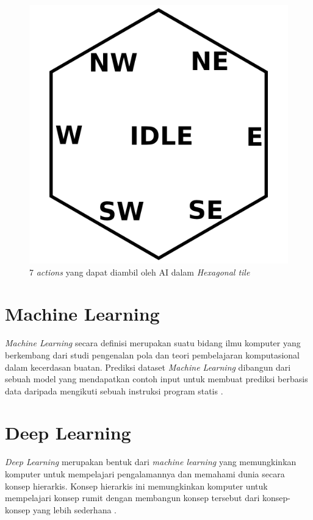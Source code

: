 \begin{figure}[H]
  \centering
    \includegraphics[scale=0.6]{gambar/hex_action.png}
    \caption{7 \emph{actions} yang dapat diambil oleh AI dalam \emph{Hexagonal tile}}
    \label{fig:hex_action}
\end{figure}

\section{Machine Learning}

\emph{Machine Learning} secara definisi merupakan suatu bidang ilmu komputer yang berkembang dari studi pengenalan pola dan teori pembelajaran komputasional dalam kecerdasan buatan. 
Prediksi dataset \emph{Machine Learning} dibangun dari sebuah model yang mendapatkan contoh input untuk membuat prediksi berbasis data daripada mengikuti sebuah instruksi program statis \citep{machineL}.

\section{Deep Learning}
\emph{Deep Learning} merupakan bentuk dari \emph{machine learning} yang memungkinkan komputer untuk mempelajari pengalamannya dan memahami dunia secara konsep hierarkis. 
Konsep hierarkis ini memungkinkan komputer untuk mempelajari konsep rumit dengan membangun konsep tersebut dari konsep-konsep yang lebih sederhana \citep{deepL}.

